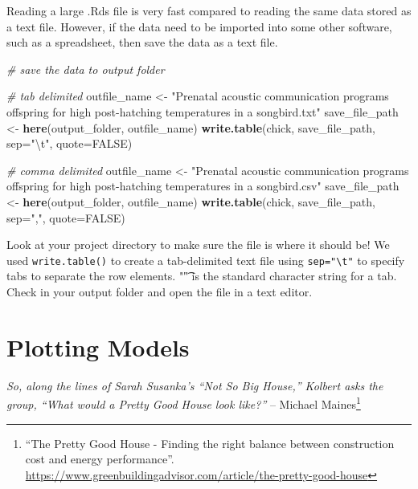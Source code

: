 \documentclass[]{book}
\newenvironment{Shaded}{\begin{snugshade}}{\end{snugshade}}
\newcommand{\CharTok}[1]{\textcolor[rgb]{0.31,0.60,0.02}{#1}}
\newcommand{\CommentTok}[1]{\textcolor[rgb]{0.56,0.35,0.01}{\textit{#1}}}
\newcommand{\DataTypeTok}[1]{\textcolor[rgb]{0.13,0.29,0.53}{#1}}
\newcommand{\KeywordTok}[1]{\textcolor[rgb]{0.13,0.29,0.53}{\textbf{#1}}}
\newcommand{\NormalTok}[1]{#1}
\newcommand{\OtherTok}[1]{\textcolor[rgb]{0.56,0.35,0.01}{#1}}
\newcommand{\StringTok}[1]{\textcolor[rgb]{0.31,0.60,0.02}{#1}}
\let\rmarkdownfootnote\footnote%
\def\footnote{\protect\rmarkdownfootnote}
\begin{document}
Reading a large .Rds file is very fast compared to reading the same data stored as a text file. However, if the data need to be imported into some other software, such as a spreadsheet, then save the data as a text file.

\begin{Shaded}
\begin{Highlighting}[]
\CommentTok{# save the data to output folder}

\CommentTok{# tab delimited}
\NormalTok{outfile_name <-}\StringTok{ "Prenatal acoustic communication programs offspring for high post-hatching temperatures in a songbird.txt"}
\NormalTok{save_file_path <-}\StringTok{ }\KeywordTok{here}\NormalTok{(output_folder, outfile_name)}
\KeywordTok{write.table}\NormalTok{(chick, save_file_path, }\DataTypeTok{sep=}\StringTok{"}\CharTok{\textbackslash{}t}\StringTok{"}\NormalTok{, }\DataTypeTok{quote=}\OtherTok{FALSE}\NormalTok{)}

\CommentTok{# comma delimited}
\NormalTok{outfile_name <-}\StringTok{ "Prenatal acoustic communication programs offspring for high post-hatching temperatures in a songbird.csv"}
\NormalTok{save_file_path <-}\StringTok{ }\KeywordTok{here}\NormalTok{(output_folder, outfile_name)}
\KeywordTok{write.table}\NormalTok{(chick, save_file_path, }\DataTypeTok{sep=}\StringTok{","}\NormalTok{, }\DataTypeTok{quote=}\OtherTok{FALSE}\NormalTok{)}
\end{Highlighting}
\end{Shaded}

Look at your project directory to make sure the file is where it should be! We used \texttt{write.table()} to create a tab-delimited text file using \texttt{sep="\textbackslash{}t"} to specify tabs to separate the row elements. "\t" is the standard character string for a tab. Check in your output folder and open the file in a text editor.

\hypertarget{plotting-models}{%
\chapter{Plotting Models}\label{plotting-models}}

\emph{So, along the lines of Sarah Susanka's ``Not So Big House,'' Kolbert asks the group, ``What would a Pretty Good House look like?''} -- Michael Maines\footnote{``The Pretty Good House - Finding the right balance between construction cost and energy performance''. \url{https://www.greenbuildingadvisor.com/article/the-pretty-good-house}}
\end{document}
